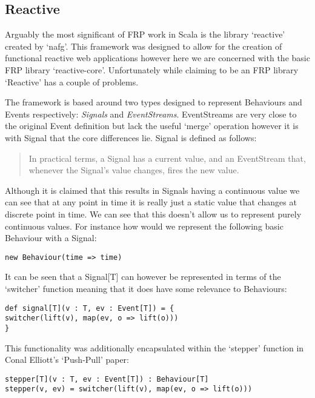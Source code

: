     \subsection{Reactive}
      Arguably the most significant of FRP work in Scala is the library `reactive' created by `nafg'. This framework was 
      designed to allow for the creation of functional reactive web applications however here we are concerned with
      the basic FRP library `reactive-core'. Unfortunately while claiming to be an FRP library `Reactive'
      has a couple of problems.
      
      The framework is based around two types designed to represent Behaviours and Events respectively: \emph{Signals}
      and \emph{EventStreams}. EventStreams are very close to the original Event definition but lack the
      useful `merge' operation however it is with Signal that the core differences lie. Signal is defined as follows:
      
      \begin{quote}
        In practical terms, a Signal has a current value, and an EventStream that, whenever the Signal's value changes,     
        fires the new value.
      \end{quote}  
      
      Although it is claimed that this results in Signals having a continuous value we can see
      that at any point in time it is really just a static value that changes at discrete point in
      time. We can see that this doesn't allow us to represent purely continuous values. For instance
      how would we represent the following basic Behaviour with a Signal:
      
\begin{verbatim}
new Behaviour(time => time)
\end{verbatim}

      It can be seen that a Signal[T] can however be represented in terms
      of the `switcher' function meaning that it does have some relevance to Behaviours:
      
\begin{verbatim}
def signal[T](v : T, ev : Event[T]) = {
switcher(lift(v), map(ev, o => lift(o)))
}
\end{verbatim}  

      This functionality was additionally encapsulated within the `stepper' function in Conal Elliott's
      `Push-Pull' paper:

\begin{verbatim}
stepper[T](v : T, ev : Event[T]) : Behaviour[T]
stepper(v, ev) = switcher(lift(v), map(ev, o => lift(o)))
\end{verbatim} 

